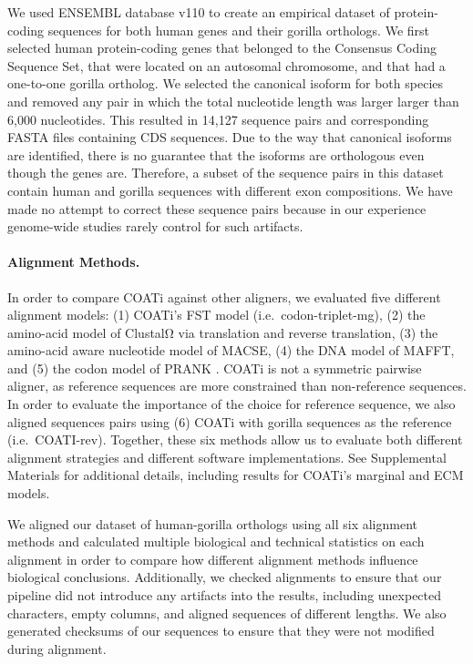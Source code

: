 \documentclass[12pt,letterpaper]{article}
\begin{document}
We used ENSEMBL database v110 \citep{ensembl_hubbard_2002} to create an empirical dataset of protein-coding sequences for both human genes and their gorilla orthologs. We first selected human protein-coding genes that belonged to the Consensus Coding Sequence Set, that were located on an autosomal chromosome, and that had a one-to-one gorilla ortholog. We selected the canonical isoform for both species and removed any pair in which the total nucleotide length was larger larger than 6,000 nucleotides. This resulted in 14,127 sequence pairs and corresponding FASTA files containing CDS sequences. Due to the way that canonical isoforms are identified, there is no guarantee that the isoforms are orthologous even though the genes are. Therefore, a subset of the sequence pairs in this dataset contain human and gorilla sequences with different exon compositions. We have made no attempt to correct these sequence pairs because in our experience genome-wide studies rarely control for such artifacts.

\paragraph{Alignment Methods.}

In order to compare COATi against other aligners, we evaluated five different alignment models: (1) COATi's FST model (i.e.\ codon-triplet-mg), (2) the amino-acid model of ClustalΩ via translation and reverse translation, (3) the amino-acid aware nucleotide model of MACSE, (4) the DNA model of MAFFT, and (5) the codon model of PRANK \citep{clustal_omega_sievers_2011,ranwez_macse_2018,katoh2013mafft,prank_loytynoja_2014}. 
COATi is not a symmetric pairwise aligner, as reference sequences are more constrained than non-reference sequences. In order to evaluate the importance of the choice for reference sequence, we also aligned sequences pairs using (6) COATi with gorilla sequences as the reference (i.e.\ COATI-rev). Together, these six methods allow us to evaluate both different alignment strategies and different software implementations. See Supplemental Materials for additional details, including results for COATi's marginal and ECM models.

We aligned our dataset of human-gorilla orthologs using all six alignment methods and calculated multiple biological and technical statistics on each alignment in order to compare how different alignment methods influence biological conclusions.
%
Additionally, we checked alignments to ensure that our pipeline did not introduce any artifacts into the results, including unexpected characters, empty columns, and aligned sequences of different lengths. We also generated checksums of our sequences to ensure that they were not modified during alignment.
\end{document}
